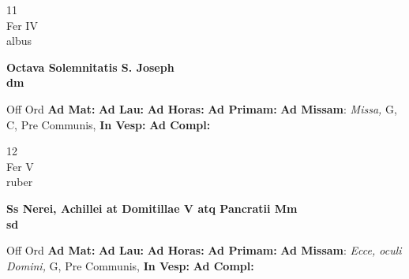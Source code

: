 \documentclass[10pt, openany]{book}
\begin{document}
        \begin{center}
            \begin{minipage}{3.5in}
                \vspace{2em}
                \begin{minipage}{0.5in}
                    {\Huge 11} \\
                    {\normalsize Fer IV} \\
                    {\normalsize albus}
                \end{minipage}
                \begin{minipage}{3.0in}
                    \textbf{ \large Octava Solemnitatis S. Joseph \\
                    \textnormal{\normalsize dm}} \\ 
                \end{minipage}
                \begin{justify}Off Ord
                    \textbf{Ad Mat: }
                    \textbf{Ad Lau: }
                    \textbf{Ad Horas: }
                    \textbf{Ad Primam: }\textbf{Ad Missam}: \textit{Missa,} G, C, Pre Communis,  
                    \textbf{In Vesp: }
                    \textbf{Ad Compl: }
                \end{justify}
            \end{minipage}
        \end{center}
    
        \begin{center}
            \begin{minipage}{3.5in}
                \vspace{2em}
                \begin{minipage}{0.5in}
                    {\Huge 12} \\
                    {\normalsize Fer V} \\
                    {\normalsize ruber}
                \end{minipage}
                \begin{minipage}{3.0in}
                    \textbf{ \large Ss Nerei, Achillei at Domitillae V atq Pancratii Mm \\
                    \textnormal{\normalsize sd}} \\ 
                \end{minipage}
                \begin{justify}Off Ord
                    \textbf{Ad Mat: }
                    \textbf{Ad Lau: }
                    \textbf{Ad Horas: }
                    \textbf{Ad Primam: }\textbf{Ad Missam}: \textit{Ecce, oculi Domini,} G, Pre Communis,  
                    \textbf{In Vesp: }
                    \textbf{Ad Compl: }
                \end{justify}
            \end{minipage}
        \end{center}
    
\end{document}

